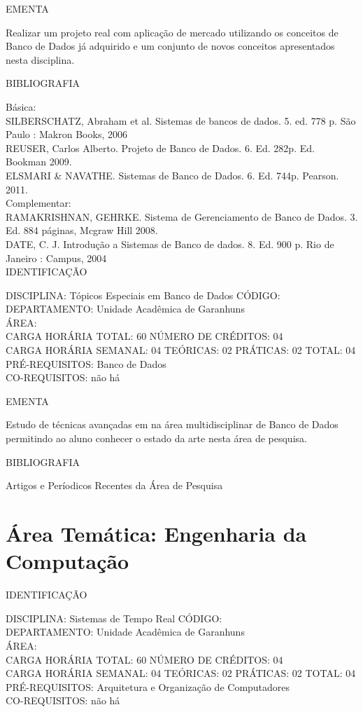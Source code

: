 \documentclass[
	12pt,				%
	openright,			%
  oneside,     %
	a4paper,			%
	english,			%
	french,				%
	spanish,			%
	brazil				%
	]{abntex2}
\begin{document}
\begin{apendicesenv}
EMENTA 

Realizar um projeto real com aplicação de mercado utilizando os
conceitos de Banco de Dados já adquirido e um conjunto de novos
conceitos apresentados nesta disciplina.

BIBLIOGRAFIA 

Básica:\\
SILBERSCHATZ, Abraham et al. Sistemas de bancos de dados. 5. ed.
778 p. São Paulo : Makron Books, 2006\\
REUSER, Carlos Alberto. Projeto de Banco de Dados. 6. Ed. 282p.
Ed. Bookman 2009.\\
ELSMARI \& NAVATHE. Sistemas de Banco de Dados. 6. Ed. 744p.
Pearson. 2011.\\
Complementar:\\
RAMAKRISHNAN, GEHRKE. Sistema de Gerenciamento de Banco de Dados. 3. Ed.
884 páginas, Mcgraw Hill 2008.\\
DATE, C. J. Introdução a Sistemas de Banco de dados. 8. Ed. 900 p. Rio
de Janeiro : Campus, 2004\\

\newpage IDENTIFICAÇÃO

DISCIPLINA: Tópicos Especiais em Banco de Dados CÓDIGO:\\
DEPARTAMENTO: Unidade Acadêmica de Garanhuns\\
ÁREA: \\
CARGA HORÁRIA TOTAL: 60 NÚMERO DE CRÉDITOS: 04\\
CARGA HORÁRIA SEMANAL: 04 TEÓRICAS: 02 PRÁTICAS: 02 TOTAL: 04\\
PRÉ-REQUISITOS: Banco de Dados\\
CO-REQUISITOS: não há

EMENTA 

Estudo de técnicas avançadas em na área multidisciplinar de Banco de
Dados permitindo ao aluno conhecer o estado da arte nesta área de
pesquisa.

BIBLIOGRAFIA 

Artigos e Períodicos Recentes da Área de Pesquisa
\newpage 

\section*{Área Temática: Engenharia da Computação}

IDENTIFICAÇÃO

DISCIPLINA: Sistemas de Tempo Real CÓDIGO:\\
DEPARTAMENTO: Unidade Acadêmica de Garanhuns\\
ÁREA: \\
CARGA HORÁRIA TOTAL: 60 NÚMERO DE CRÉDITOS: 04\\
CARGA HORÁRIA SEMANAL: 04 TEÓRICAS: 02 PRÁTICAS: 02 TOTAL: 04\\
PRÉ-REQUISITOS: Arquitetura e Organização de Computadores\\
CO-REQUISITOS: não há


\end{apendicesenv}
\end{document}
